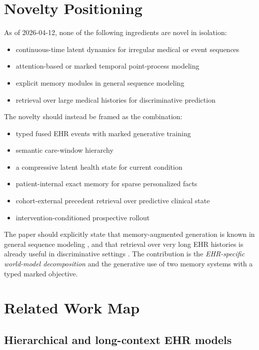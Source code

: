 \documentclass[11pt]{article}
\begin{document}
\section{Novelty Positioning}

As of 2026-04-12, none of the following ingredients are novel in isolation:
\begin{itemize}
    \item continuous-time latent dynamics for irregular medical or event sequences
    \item attention-based or marked temporal point-process modeling
    \item explicit memory modules in general sequence modeling
    \item retrieval over large medical histories for discriminative prediction
\end{itemize}

The novelty should instead be framed as the combination:
\begin{itemize}
    \item typed fused EHR events with marked generative training
    \item semantic care-window hierarchy
    \item a compressive latent health state for current condition
    \item patient-internal exact memory for sparse personalized facts
    \item cohort-external precedent retrieval over predictive clinical state
    \item intervention-conditioned prospective rollout
\end{itemize}

The paper should explicitly state that memory-augmented generation is known in
general sequence modeling \cite{rae2020compressive,wu2022memorizing,bulatov2022rmt,borgeaud2022retro,behrouz2025titans},
and that retrieval over very long EHR histories is already useful in
discriminative settings \cite{kim2024remed}. The contribution is the
\emph{EHR-specific world-model decomposition} and the generative use of two
memory systems with a typed marked objective.

\section{Related Work Map}

\subsection{Hierarchical and long-context EHR models}
\end{document}
